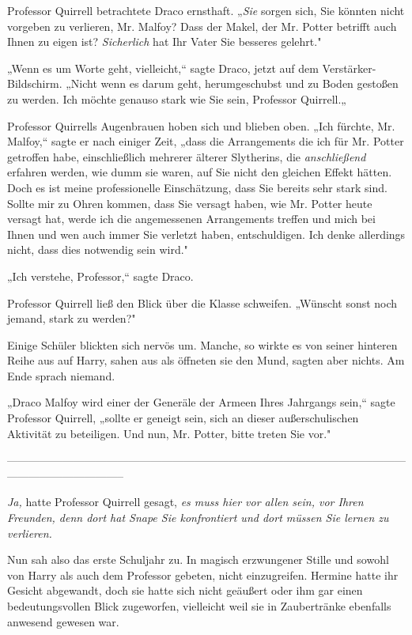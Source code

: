 {Professor Quirrell betrachtete Draco ernsthaft. „\emph{Sie} sorgen sich, Sie könnten nicht vorgeben zu verlieren, Mr. Malfoy? Dass der Makel, der Mr. Potter betrifft auch Ihnen zu eigen ist? \emph{Sicherlich} hat Ihr Vater Sie besseres gelehrt."

„Wenn es um Worte geht, vielleicht,“ sagte Draco, jetzt auf dem Verstärker-Bildschirm. „Nicht wenn es darum geht, herumgeschubst und zu Boden gestoßen zu werden. Ich möchte genauso stark wie Sie sein, Professor Quirrell.„

Professor Quirrells Augenbrauen hoben sich und blieben oben. „Ich fürchte, Mr. Malfoy,“ sagte er nach einiger Zeit, „dass die Arrangements die ich für Mr. Potter getroffen habe, einschließlich mehrerer älterer Slytherins, die \emph{anschließend} erfahren werden, wie dumm sie waren, auf Sie nicht den gleichen Effekt hätten. Doch es ist meine professionelle Einschätzung, dass Sie bereits sehr stark sind. Sollte mir zu Ohren kommen, dass Sie versagt haben, wie Mr. Potter heute versagt hat, werde ich die angemessenen Arrangements treffen und mich bei Ihnen und wen auch immer Sie verletzt haben, entschuldigen. Ich denke allerdings nicht, dass dies notwendig sein wird."

„Ich verstehe, Professor,“ sagte Draco.

Professor Quirrell ließ den Blick über die Klasse schweifen. „Wünscht sonst noch jemand, stark zu werden?"

Einige Schüler blickten sich nervös um. Manche, so wirkte es von seiner hinteren Reihe aus auf Harry, sahen aus als öffneten sie den Mund, sagten aber nichts. Am Ende sprach niemand.

„Draco Malfoy wird einer der Generäle der Armeen Ihres Jahrgangs sein,“ sagte Professor Quirrell, „sollte er geneigt sein, sich an dieser außerschulischen Aktivität zu beteiligen. Und nun, Mr. Potter, bitte treten Sie vor."

--------------------------------------------------------------------------------------------------------------------------------------------

\hfill\break \emph{Ja,} hatte Professor Quirrell gesagt, \emph{es muss hier vor allen sein, vor Ihren Freunden, denn dort hat Snape Sie konfrontiert und dort müssen Sie lernen zu verlieren.}

Nun sah also das erste Schuljahr zu. In magisch erzwungener Stille und sowohl von Harry als auch dem Professor gebeten, nicht einzugreifen. Hermine hatte ihr Gesicht abgewandt, doch sie hatte sich nicht geäußert oder ihm gar einen bedeutungsvollen Blick zugeworfen, vielleicht weil sie in Zaubertränke ebenfalls anwesend gewesen war.

}
